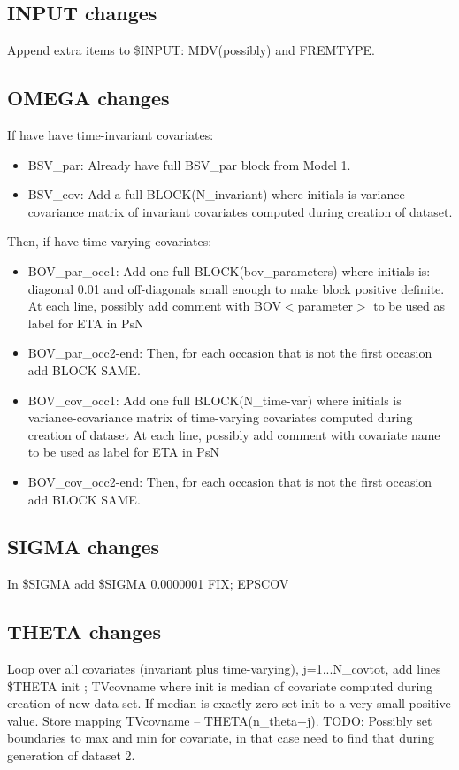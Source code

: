 \subsection{INPUT changes}
Append extra items to \$INPUT: MDV(possibly) and FREMTYPE.

\subsection{OMEGA changes}
If have have time-invariant covariates:
\begin{itemize}
\item BSV\_par: Already have full BSV\_par block from Model 1.
\item BSV\_cov: Add a full BLOCK(N\_invariant) where initials is variance-covariance matrix of invariant covariates computed during creation of dataset.
\end{itemize}
\noindent 
Then, if have time-varying covariates:
\begin{itemize}
\item BOV\_par\_occ1: Add one full BLOCK(bov\_parameters) where initials is: diagonal 0.01 and off-diagonals small enough to make
block positive definite.
At each line, possibly add comment with BOV$<$parameter$>$ to be used as label for ETA in PsN
\item BOV\_par\_occ2-end: Then, for each occasion that is not the first occasion add BLOCK SAME.
\item BOV\_cov\_occ1: Add one full BLOCK(N\_time-var) where initials is variance-covariance matrix of time-varying covariates computed during creation of dataset
At each line, possibly add comment with covariate name to be used as label for ETA in PsN
\item BOV\_cov\_occ2-end: Then, for each occasion that is not the first occasion add BLOCK SAME.
\end{itemize}
\subsection{SIGMA changes}
In \$SIGMA add 
\$SIGMA 0.0000001 FIX; EPSCOV

\subsection{THETA changes}
Loop over all covariates (invariant plus time-varying), j=1...N\_covtot, add lines
\$THETA init ; TVcovname
where init is median of covariate computed during creation of new data set. If median is exactly zero set
init to a very small positive value. 
Store mapping TVcovname – THETA(n\_theta+j). 
TODO: Possibly set boundaries to max and min for covariate, in that case need to find that during generation of dataset 2.

